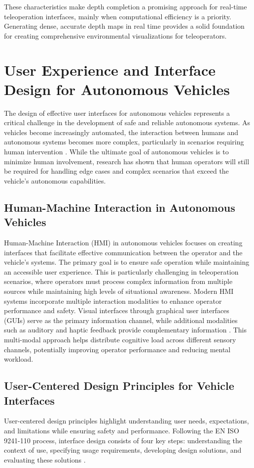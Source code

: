 These characteristics make depth completion a promising approach for real-time teleoperation interfaces, mainly when computational efficiency is a priority. Generating dense, accurate depth maps in real time provides a solid foundation for creating comprehensive environmental visualizations for teleoperators.

\section{User Experience and Interface Design for Autonomous Vehicles}
The design of effective user interfaces for autonomous vehicles represents a critical challenge in the development of safe and reliable autonomous systems. As vehicles become increasingly automated, the interaction between humans and autonomous systems becomes more complex, particularly in scenarios requiring human intervention \cite{Kettwich}. While the ultimate goal of autonomous vehicles is to minimize human involvement, research has shown that human operators will still be required for handling edge cases and complex scenarios that exceed the vehicle's autonomous capabilities\cite{mutzenich2021updating}.
\subsection{Human-Machine Interaction in Autonomous Vehicles}
Human-Machine Interaction (HMI) in autonomous vehicles focuses on creating interfaces that facilitate effective communication between the operator and the vehicle's systems. The primary goal is to ensure safe operation while maintaining an accessible user experience. This is particularly challenging in teleoperation scenarios, where operators must process complex information from multiple sources while maintaining high levels of situational awareness\cite{Georg}.
Modern HMI systems incorporate multiple interaction modalities to enhance operator performance and safety. Visual interfaces through graphical user interfaces (GUIs) serve as the primary information channel, while additional modalities such as auditory and haptic feedback provide complementary information \cite{kallioniemi2021enhancing}. This multi-modal approach helps distribute cognitive load across different sensory channels, potentially improving operator performance and reducing mental workload.
\subsection{User-Centered Design Principles for Vehicle Interfaces}
User-centered design principles highlight understanding user needs, expectations, and limitations while ensuring safety and performance. Following the EN ISO 9241-110 process, interface design consists of four key steps: understanding the context of use, specifying usage requirements, developing design solutions, and evaluating these solutions \cite{Georg}.

